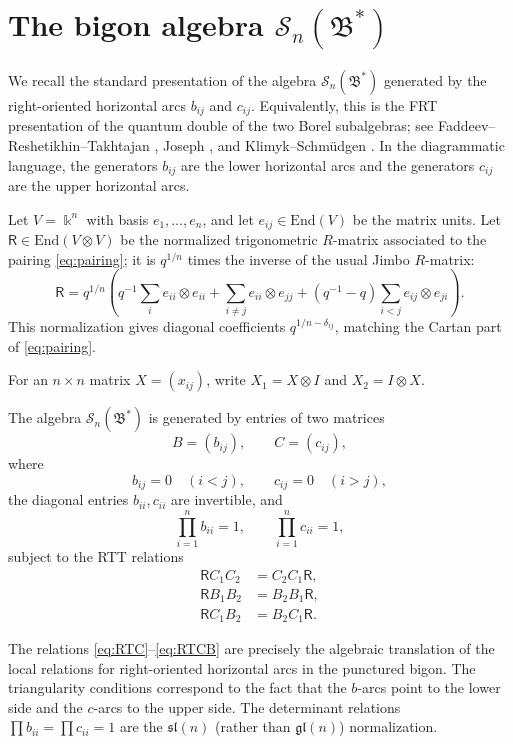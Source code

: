 \documentclass[11pt]{article}
\newcommand{\bk}{\Bbbk}
\newcommand{\cS}{\mathcal S}
\newcommand{\slq}{\mathfrak{sl}(n)}
\newcommand{\glq}{\mathfrak{gl}(n)}
\newcommand{\End}{\mathrm{End}}
\begin{document}
\section{The bigon algebra \(\cS_n(\mathfrak B^*)\)}

We recall the standard presentation of the algebra \(\cS_n(\mathfrak B^*)\) generated by the right-oriented horizontal arcs \(b_{ij}\) and \(c_{ij}\).  Equivalently, this is the FRT presentation of the quantum double of the two Borel subalgebras; see Faddeev--Reshetikhin--Takhtajan \cite{FRT}, Joseph \cite{Jo}, and Klimyk--Schm\"udgen \cite[\S 9]{KS}.  In the diagrammatic language, the generators \(b_{ij}\) are the lower horizontal arcs and the generators \(c_{ij}\) are the upper horizontal arcs.

Let \(V=\bk^n\) with basis \(e_1,\dots,e_n\), and let \(e_{ij}\in\End(V)\) be the matrix units.  Let \(\mathsf R\in\End(V\otimes V)\) be the normalized trigonometric \(R\)-matrix associated to the pairing \eqref{eq:pairing}; it is \(q^{1/n}\) times the inverse of the usual Jimbo \(R\)-matrix:
\begin{equation}\label{eq:Rmat}
\mathsf R
=
q^{1/n}\left(
q^{-1}\sum_i e_{ii}\otimes e_{ii}
+\sum_{i\neq j}e_{ii}\otimes e_{jj}
+(q^{-1}-q)\sum_{i<j}e_{ij}\otimes e_{ji}
\right).
\end{equation}
This normalization gives diagonal coefficients \(q^{1/n-\delta_{ij}}\), matching the Cartan part of \eqref{eq:pairing}.

For an \(n\times n\) matrix \(X=(x_{ij})\), write \(X_1=X\otimes I\) and \(X_2=I\otimes X\).

\begin{definition}\label{def:bigon}
The algebra \(\cS_n(\mathfrak B^*)\) is generated by entries of two matrices
\[
B=(b_{ij}),\qquad C=(c_{ij}),
\]
where
\[
b_{ij}=0\quad(i<j),\qquad c_{ij}=0\quad(i>j),
\]
the diagonal entries \(b_{ii},c_{ii}\) are invertible, and
\[
\prod_{i=1}^n b_{ii}=1,\qquad \prod_{i=1}^n c_{ii}=1,
\]
subject to the RTT relations
\begin{align}
\mathsf R C_1 C_2&=C_2C_1\mathsf R, \label{eq:RTC}\\
\mathsf R B_1 B_2&=B_2B_1\mathsf R, \label{eq:RTB}\\
\mathsf R C_1 B_2&=B_2C_1\mathsf R. \label{eq:RTCB}
\end{align}
\end{definition}

\begin{remark}
The relations \eqref{eq:RTC}--\eqref{eq:RTCB} are precisely the algebraic translation of the local relations for right-oriented horizontal arcs in the punctured bigon.  The triangularity conditions correspond to the fact that the \(b\)-arcs point to the lower side and the \(c\)-arcs to the upper side.  The determinant relations \(\prod b_{ii}=\prod c_{ii}=1\) are the \(\slq\) (rather than \(\glq\)) normalization.
\end{remark}
\end{document}
